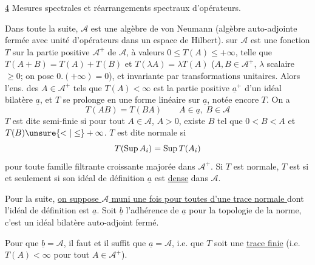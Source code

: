 
\uline{4} Mesures spectrales et réarrangements spectraux d'opérateurs.

Dans toute la suite, $\mathcal A$ est une algèbre de von Neumann (algèbre auto-adjointe  fermée  avec unité d'opérateurs dans un espace de Hilbert).   sur $\mathcal A$ est une  fonction $T$ sur la partie positive $\mathcal A^+$ de $\mathcal A$, à valeurs $0\leq T(A)\leq+\infty$,  telle que $T(A+B)=T(A)+T(B)$ et $T(\lambda A)=\lambda T(A)$ ($A,B\in\mathcal A^+$, $\lambda$  scalaire $\geq0$; on pose $0.(+\infty)=0$), et invariante par transformations unitaires. Alors l'ens. des $A\in\mathcal A^+$ tels que $T(A)<\infty$ est la partie positive $\underline a^+$ d'un idéal bilatère  $\underline a$,  et $T$ se prolonge en une forme linéaire sur $\underline a$, notée encore $T$. On a
\[
T(AB)=T(BA)\qquad A\in\underline a,\ B\in\mathcal A
\]
$T$ est dite  semi-finie si pour tout  $A\in\mathcal A$, $A>0$, existe $B$ tel que $0<B<A$ et $T(B)\unsure{<|\leq}+\infty$. $T$ est dite normale si
\[
T(\mathop{\rm Sup} A_i)=\mathop{\rm Sup} T(A_i)
\]
pour toute famille filtrante croissante majorée  dans $\mathcal A^+$. Si $T$ est normale, $T$ est   si et seulement si  son idéal de définition $\underline a$ est \uline{ dense} dans $\mathcal A$.


Pour la suite, \uline{on suppose $\mathcal A$ muni une fois pour toutes d'une trace normale   } dont l'idéal de définition est $\underline a$. Soit $\underline b$ l'adhérence de $\underline a$ pour la topologie de la norme, c'est un idéal bilatère auto-adjoint  fermé.

 
Pour que  $\underline b=\mathcal A$, il faut et il suffit que $\underline a=\mathcal A$, i.e. que $T$ soit une \uline{trace finie} (i.e. $T(A)<\infty$ pour tout $A\in\mathcal A^+$).

